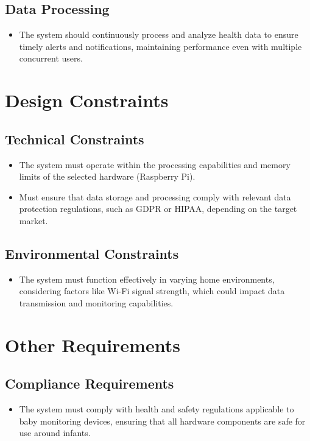 \documentclass[12pt,a4paper]{report}
\begin{document}
\subsection{Data Processing}
\begin{itemize}
  \item The system should continuously process and analyze health data to ensure timely alerts and notifications, maintaining performance even with multiple concurrent users.
\end{itemize}

\section{Design Constraints}

\subsection{Technical Constraints}
\begin{itemize}
  \item The system must operate within the processing capabilities and memory limits of the selected hardware (Raspberry Pi).
  \item Must ensure that data storage and processing comply with relevant data protection regulations, such as GDPR or HIPAA, depending on the target market.
\end{itemize}

\subsection{Environmental Constraints}
\begin{itemize}
  \item The system must function effectively in varying home environments, considering factors like Wi-Fi signal strength, which could impact data transmission and monitoring capabilities.
\end{itemize}

\section{Other Requirements}

\subsection{Compliance Requirements}
\begin{itemize}
  \item The system must comply with health and safety regulations applicable to baby monitoring devices, ensuring that all hardware components are safe for use around infants.
\end{itemize}
\end{document}
